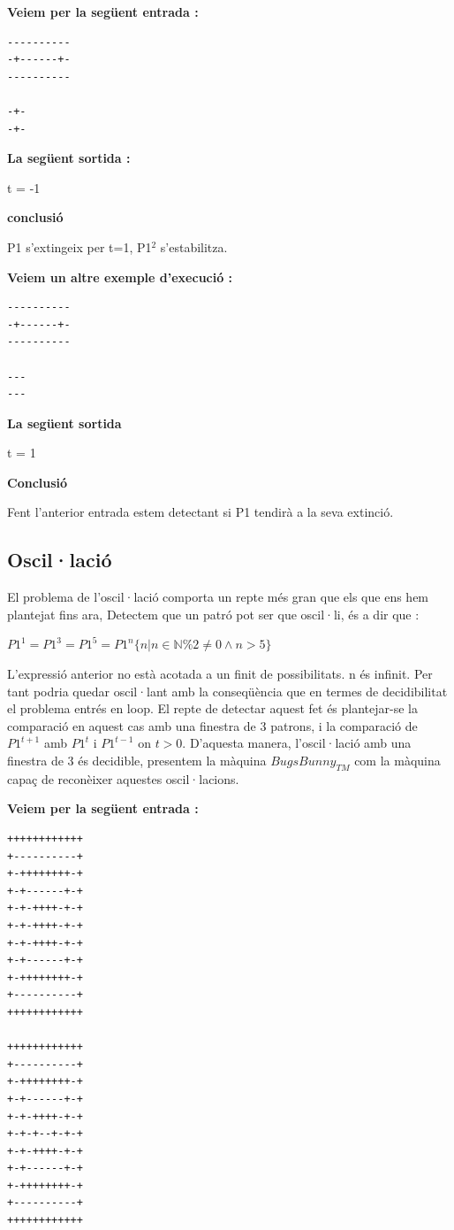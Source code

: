 \documentclass[12pt,a4paper]{report}
\def \tm{$BugsBunny_{TM} $}
\begin{document}
\textbf{Veiem per la següent entrada :}

\begin{lstlisting}
----------
-+------+-
----------

-+-
-+-
\end{lstlisting}

\textbf{La següent sortida :}

t = -1


\textbf{conclusió}

P1 s'extingeix per t=1, P1$^2$ s'estabilitza.


\textbf{Veiem un altre exemple d’execució : }

\begin{lstlisting}
----------
-+------+-
----------

---
---
\end{lstlisting}

\textbf{La següent sortida}

t = 1

\textbf{Conclusió}

Fent l’anterior entrada estem detectant si P1 tendirà a la seva extinció.

\subsection{Oscil·lació}

El problema de l’oscil·lació comporta un repte més gran que els que ens hem plantejat fins ara, Detectem que un patró pot ser que oscil·li, és a dir que :

\begin{center}
$P1^1 = P1^3 = P1^5 = P1^n \{ n | n \in \mathbb{N} \% 2 \neq 0 \wedge n > 5 \} $
\end{center}

L’expressió anterior no està acotada a un finit de possibilitats. n és infinit. Per tant podria quedar oscil·lant amb la conseqüència que en termes de decidibilitat el problema entrés en loop. El repte de detectar aquest fet és plantejar-se la comparació en aquest cas amb una finestra de 3 patrons, i la comparació de $P1^{t+1}$ amb $P1^t$ i $P1^{t-1}$ on $t > 0$. D’aquesta manera, l'oscil·lació amb una finestra de 3 és decidible, presentem la màquina \tm{} com la màquina capaç de reconèixer aquestes oscil·lacions.

\textbf{Veiem per la següent entrada :}

\begin{lstlisting}
++++++++++++
+----------+
+-++++++++-+
+-+------+-+
+-+-++++-+-+
+-+-++++-+-+
+-+-++++-+-+
+-+------+-+
+-++++++++-+
+----------+
++++++++++++

++++++++++++
+----------+
+-++++++++-+
+-+------+-+
+-+-++++-+-+
+-+-+--+-+-+
+-+-++++-+-+
+-+------+-+
+-++++++++-+
+----------+
++++++++++++
\end{lstlisting}
\end{document}
